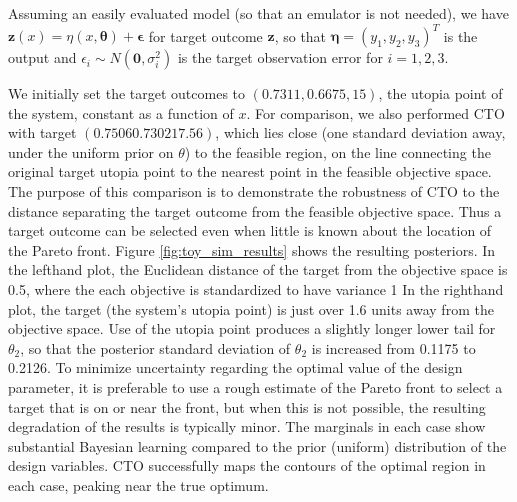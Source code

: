 \documentclass[12pt]{article}
\begin{document}
%
Assuming an easily evaluated model (so that an emulator is not needed), we have
%
$
\mathbf z(x) = \eta(x,\boldsymbol \theta) + \boldsymbol\epsilon
$
%
for target outcome $\mathbf z$, so that  $\boldsymbol\eta = (y_1,y_2,y_3)^T$ is the output and $\epsilon_i\sim N(\mathbf 0,\sigma_i^2)$ is the target observation error for $i=1,2,3$.
%
%

We initially set the target outcomes to $(0.7311, 0.6675, 15)$, the utopia point of the system, constant as a function of $x$. 
%
%
For comparison, we also performed CTO with target $(0.7506    0.7302   17.56)$, which lies close (one standard deviation away, under the uniform prior on $\theta$) to the feasible region, on the line connecting the original target utopia point to the nearest point in the feasible objective space.
%
The purpose of this comparison is to demonstrate the robustness of CTO to the distance separating the target outcome from the feasible objective space.
%
Thus a target outcome can be selected even when little is known about the location of the Pareto front.
%
Figure \ref{fig:toy_sim_results} shows the resulting posteriors. %
%
In the lefthand plot, the Euclidean distance of the target from the objective space is 0.5, where the each objective is standardized to have variance 1
%
In the righthand plot, the target (the system's utopia point) is just over 1.6 units away from the objective space.
%
Use of the utopia point produces a slightly longer lower tail for $\theta_2$, so that the posterior standard deviation of $\theta_2$ is increased from 0.1175 to 0.2126.
%
To minimize uncertainty regarding the optimal value of the design parameter, it is preferable to use a rough estimate of the Pareto front to select a target that is on or near the front, but when this is not possible, the resulting degradation of the results is typically minor.
%
The marginals in each case show substantial Bayesian learning compared to the prior (uniform) distribution of the design variables. 
%
CTO successfully maps the contours of the optimal region in each case, peaking near the true optimum. 
%
\end{document}
